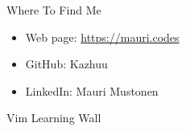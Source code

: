 \documentclass{beamer}
\begin{document}
\begin{frame}{Where To Find Me}
    \begin{itemize}
        \item Web page: \url{https://mauri.codes}
        \item GitHub: Kazhuu
        \item LinkedIn: Mauri Mustonen
    \end{itemize}
\end{frame}
\usebackgroundtemplate{}

\begin{frame}{Vim Learning Wall}
\end{frame}
\usebackgroundtemplate{}
\end{document}
